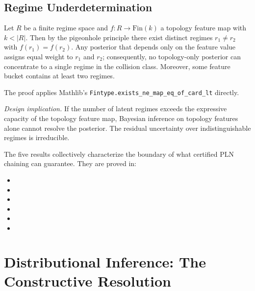 \documentclass[11pt,openany]{report}
\begin{document}
\subsection*{Regime Underdetermination}

\begin{theorem}
\label{thm:regime-underdetermination}
Let $R$ be a finite regime space and $f : R \to \mathrm{Fin}(k)$ a topology
feature map with $k < |R|$.  Then by the pigeonhole principle there exist
distinct regimes $r_1 \ne r_2$ with $f(r_1) = f(r_2)$.  Any posterior that
depends only on the feature value assigns equal weight to $r_1$ and $r_2$;
consequently, no topology-only posterior can concentrate to a single regime
in the collision class.  Moreover, some feature bucket contains at least two
regimes.
\end{theorem}

The proof applies Mathlib's \texttt{Fintype.exists\_ne\_map\_eq\_of\_card\_lt}
directly.

\textit{Design implication.}  If the number of latent regimes exceeds the
expressive capacity of the topology feature map, Bayesian inference on
topology features alone cannot resolve the posterior.  The residual
uncertainty over indistinguishable regimes is irreducible.

\medskip
The five results collectively characterize the boundary of what certified
PLN chaining can guarantee.  They are proved in:
\begin{itemize}
  \item {}
  \item {}
  \item {}
  \item {}
  \item {}
  \item {}
\end{itemize}


\section{Distributional Inference: The Constructive Resolution}
\label{sec:distributional-inference}
\end{document}
